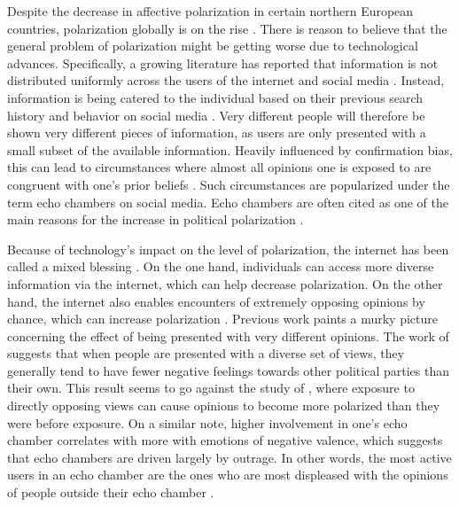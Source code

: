 \documentclass[11pt]{article}
\begin{document}
\noindent Despite the decrease in affective polarization in certain northern European countries, polarization globally is on the rise \cite{boxell_cross-country_2020,mccoy_polarization_2018, somer_deja_2018}. There is reason to believe that the general problem of polarization might be getting worse due to technological advances.
Specifically, a growing literature has reported that information is not distributed uniformly across the users of the internet and social media \cite{taylor_exploring_2018, sasahara_social_2021,baumann_modeling_2020,tsai_echo_2020}. Instead, information is being catered to the individual based on their previous search history and behavior on social media \cite{geschke2019triple}. Very different people will therefore be shown very different pieces of information, as users are only presented with a small subset of the available information. 
Heavily influenced by confirmation bias, this can lead to circumstances where almost all opinions one is exposed to are congruent with one’s prior beliefs \cite{baumann_modeling_2020}. Such circumstances are popularized under the term echo chambers on social media. Echo chambers are often cited as one of the main reasons for the increase in political polarization \cite{baumann_modeling_2020, sasahara_social_2021, tsai_echo_2020, geschke2019triple}. 

Because of technology's impact on the level of polarization, the internet has been called a mixed blessing \cite{lev-on_happy_2009}. On the one hand, individuals can access more diverse information via the internet, which can help decrease polarization. On the other hand, the internet also enables encounters of extremely opposing opinions by chance, which can increase polarization \cite{lev-on_happy_2009}.
Previous work paints a murky picture concerning the effect of being presented with very different opinions. The work of  suggests that when people are presented with a diverse set of views, they generally tend to have fewer negative feelings towards other political parties than their own. This result seems to go against the study of , where exposure to directly opposing views can cause opinions to become more polarized than they were before exposure. 
On a similar note, higher involvement in one’s echo chamber correlates with more with emotions of negative valence, which suggests that echo chambers are driven largely by outrage. In other words, the most active users in an echo chamber are the ones who are most displeased with the opinions of people outside their echo chamber \cite{del_vicario_echo_2016}.
\end{document}
